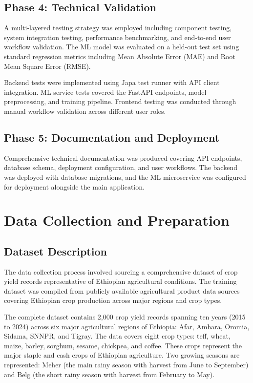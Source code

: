 \subsection{Phase 4: Technical Validation}

A multi-layered testing strategy was employed including component testing, system integration testing, performance benchmarking, and end-to-end user workflow validation. The ML model was evaluated on a held-out test set using standard regression metrics including Mean Absolute Error (MAE) and Root Mean Square Error (RMSE).

Backend tests were implemented using Japa test runner with API client integration. ML service tests covered the FastAPI endpoints, model preprocessing, and training pipeline. Frontend testing was conducted through manual workflow validation across different user roles.

\subsection{Phase 5: Documentation and Deployment}

Comprehensive technical documentation was produced covering API endpoints, database schema, deployment configuration, and user workflows. The backend was deployed with database migrations, and the ML microservice was configured for deployment alongside the main application.

\section{Data Collection and Preparation}

\subsection{Dataset Description}

The data collection process involved sourcing a comprehensive dataset of crop yield records representative of Ethiopian agricultural conditions. The training dataset was compiled from publicly available agricultural product data sources covering Ethiopian crop production across major regions and crop types.

The complete dataset contains 2,000 crop yield records spanning ten years (2015 to 2024) across six major agricultural regions of Ethiopia: Afar, Amhara, Oromia, Sidama, SNNPR, and Tigray. The data covers eight crop types: teff, wheat, maize, barley, sorghum, sesame, chickpea, and coffee. These crops represent the major staple and cash crops of Ethiopian agriculture. Two growing seasons are represented: Meher (the main rainy season with harvest from June to September) and Belg (the short rainy season with harvest from February to May).


